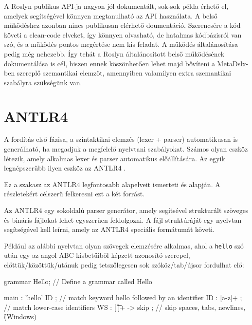 \documentclass[12pt, a4paper]{report}
\newcommand{\f}[1]{\texttt{#1}}
\begin{document}
A Roslyn publikus API-ja nagyon jól dokumentált, sok-sok példa érhető el, amelyek segítségével könnyen megtanulható az API használata. A belső működéshez azonban nincs publikusan elérhető doumentáció. Szerencsére a kód követi a clean-code elveket, így könnyen olvasható, de hatalmas kódbázisról van szó, és a működés pontos megértése nem kis feladat. A működés általánosítása pedig még nehezebb. Így tehát a Roslyn általánosított belső működésének dokumentálása is cél, hiszen ennek köszönhetően lehet majd bővíteni a MetaDslx-ben szereplő szemantikai elemzőt, amennyiben valamilyen extra szemantikai szabályra szükségünk van.


\section{ANTLR4}

A fordítás első fázisa, a szintaktikai elemzés (lexer + parser) automatikusan is generálható, ha megadjuk a megfelelő nyelvtani szabályokat. Számos olyan eszköz létezik, amely alkalmas lexer és parser automatikus előállítására. Az egyik legnépszerűbb ilyen eszköz az ANTLR4 \cite{Antlr4}.

Ez a szakasz az ANTLR4 legfontosabb alapelveit ismerteti \cite{Antlr4Guide} és \cite{Antlr4Doc} alapján. A részletekért célszerű felkeresni ezt a két forrást.

Az ANTLR4 egy sokoldalú parser generátor, amely segítsével strukturált szöveges és bináris fájlokat lehet egyszerűen feldolgozni. A fájl struktúráját egy nyelvtan segítségével kell leírni, amely az ANTLR4 speciális formátumát követi.

Például az alábbi nyelvtan olyan szövegek elemzésére alkalmas, ahol a \f{hello} szó után egy az angol ABC kisbetűiből képzett azonosító szerepel, előttük/közöttük/utánuk pedig tetszőlegesen sok szóköz/tab/újsor fordulhat elő:

\begin{antlr4code}
grammar Hello; // Define a grammar called Hello

main : 'hello' ID ; // match keyword hello followed by an identifier
ID : [a-z]+ ; // match lower-case identifiers
WS : [ \t\r\n]+ -> skip ; // skip spaces, tabs, newlines, \r (Windows)
\end{antlr4code}
\end{document}
